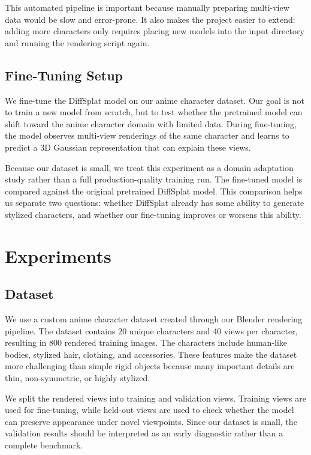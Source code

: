 \documentclass[10pt,twocolumn,letterpaper]{article}
\begin{document}
This automated pipeline is important because manually preparing multi-view data would be slow and error-prone. It also makes the project easier to extend: adding more characters only requires placing new models into the input directory and running the rendering script again.

\subsection{Fine-Tuning Setup}

We fine-tune the DiffSplat model on our anime character dataset. Our goal is not to train a new model from scratch, but to test whether the pretrained model can shift toward the anime character domain with limited data. During fine-tuning, the model observes multi-view renderings of the same character and learns to predict a 3D Gaussian representation that can explain these views.

Because our dataset is small, we treat this experiment as a domain adaptation study rather than a full production-quality training run. The fine-tuned model is compared against the original pretrained DiffSplat model. This comparison helps us separate two questions: whether DiffSplat already has some ability to generate stylized characters, and whether our fine-tuning improves or worsens this ability.

\section{Experiments}

\subsection{Dataset}

We use a custom anime character dataset created through our Blender rendering pipeline. The dataset contains 20 unique characters and 40 views per character, resulting in 800 rendered training images. The characters include human-like bodies, stylized hair, clothing, and accessories. These features make the dataset more challenging than simple rigid objects because many important details are thin, non-symmetric, or highly stylized.

We split the rendered views into training and validation views. Training views are used for fine-tuning, while held-out views are used to check whether the model can preserve appearance under novel viewpoints. Since our dataset is small, the validation results should be interpreted as an early diagnostic rather than a complete benchmark.
\end{document}
